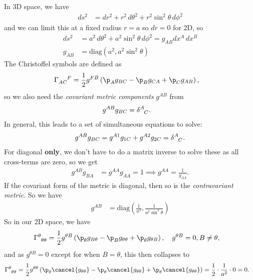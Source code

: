 \documentclass[a4paper, 11pt, normalem]{report}
\begin{document}
\begin{example}
In 3D space, we have
\begin{align}
    ds^2 &= dr^2 + r^2\,d\theta^2 + r^2\sin^2\theta\,d\phi^2
\end{align}
and we can limit this at a fixed radius $r=a$ so $dr=0$ for 2D, so
\begin{align}
    ds^2 &= a^2\,d\theta^2 + a^2\sin^2\theta\,d\phi^2 = g_{AB}dx^A\,dx^B \\
    g_{AB} &= \text{diag}(a^2,a^2\sin^2\theta)
\end{align}
The Christoffel symbols are defined as
\begin{align}
    \tensor{\Gamma}{_{AC}^F} &= \frac12g^{FB}\left(\p_Ag_{BC}-\p_Bg_{CA}+\p_Cg_{AB}\right),
\end{align}
so we also need the \emph{covariant metric components} $g^{AB}$ from
\begin{align}
    g^{AB}g_{BC} &= \tensor{\delta}{^A_C}.
\end{align}
In general, this leads to a set of simultaneous equations to solve:
\begin{align}
    g^{AB}g_{BC} = g^{A1}g_{1C} + g^{A2}g_{2C} = \tensor{\delta}{^A_C}.
\end{align}
For diagonal \textbf{only}, we don't have to do a matrix inverse to solve these as all cross-terms are zero, so we get
\begin{align}
    g^{AB}g_{BA} &= g^{AA}g_{AA} = 1 \implies g^{AA} = \frac{1}{g_{AA}}.
\end{align}
If the covariant form of the metric is diagonal, then so is the \emph{contravariant metric}.
So we have
\begin{align}
    g^{AB} &= \text{diag}\left(\frac{1}{a^2},\frac{1}{a^2\sin^2\theta}\right)
\end{align}
So in our 2D space, we have
\begin{align}
    \tensor{\Gamma}{^\theta_{\theta\theta}} &= \frac12 g^{\theta B} \left(\p_\theta g_{B\theta} - \p_B g_{\theta\theta} + \p_{\theta} g_{\theta B}\right), \quad g^{\theta B} = 0, B\neq\theta,
\end{align}
and as $g^{\theta B}=0$ except for when $B=\theta$, this then collapses to
\begin{align}
    \tensor{\Gamma}{^\theta_{\theta\theta}} &= \frac12 g^{\theta\theta}\left(\p_\theta\cancel{g_{\theta\theta}}-\p_\theta\cancel{g_{\theta\theta}}+\p_\theta\cancel{g_{\theta\theta}}\right) = \frac12\cdot \frac{1}{a^2} \cdot 0 = 0.
\end{align}

\end{example}
\end{document}
